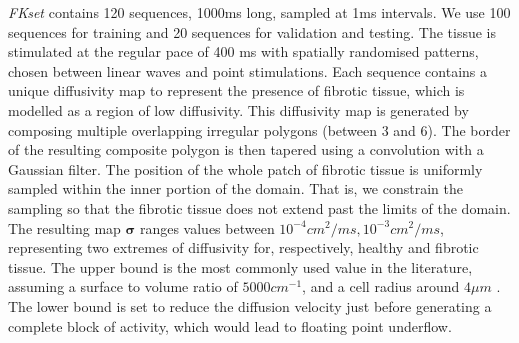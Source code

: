 \documentclass[utf8]{frontiersSCNS} %
\begin{document}
\textit{FKset} contains 120 sequences, 1000ms long, sampled at 1ms intervals. We use 100 sequences for training and 20 sequences for validation and testing.
The tissue is stimulated at the regular pace of 400 ms with spatially randomised patterns, chosen between linear waves and point stimulations.
%
Each sequence contains a unique diffusivity map to represent the presence of fibrotic tissue, which is modelled as a region of low diffusivity. This diffusivity map is generated by composing multiple overlapping irregular polygons (between 3 and 6). The border of the resulting composite polygon is then tapered using a convolution with a Gaussian filter. The position of the whole patch of fibrotic tissue is uniformly sampled within the inner portion of the domain. That is, we constrain the sampling so that the fibrotic tissue does not extend past the limits of the domain.
The resulting map $\boldsymbol{\sigma}$ ranges values between $10^{-4}cm^2/ms, 10^{-3}cm^2/ms$, representing two extremes of diffusivity for, respectively, healthy and fibrotic tissue. The upper bound is the most commonly used value in the literature, assuming a surface to volume ratio of $5000 cm^{-1}$, and a cell radius around $4 \mu m$ \cite[]{Fenton2002}. The lower bound is set to reduce the diffusion velocity just before generating a complete block of activity, which would lead to floating point underflow.


\end{document}
